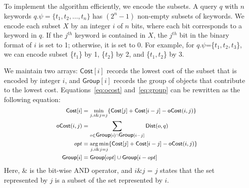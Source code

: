 \documentclass{sig-alternate}
\newcommand{\Dist}{\mbox{$\mathsf{Dist}$}\xspace}
\newcommand{\Cost}{\mbox{$\mathsf{Cost}$}}
\newcommand{\Group}{\mbox{$\mathsf{Group}$}}
\newcounter{example}[section]
\begin{document}
To implement the algorithm efficiently, we encode the subsets.  A
query $q$ with $n$ keywords $q.\psi = \{t_1, t_2, \ldots, t_n\}$ has
$(2^n-1)$ non-empty subsets of keywords. We encode each subset $X$ by
an integer $i$ of $n$ bits, where each bit corresponds to a keyword in
$q$.
%
If the $j^{th}$ keyword is contained in $X$, the $j^{th}$ bit
in the binary format of $i$ is set to 1; otherwise, it is set to 0.
%
For example, for $q.\psi$=\{$t_1, t_2, t_3$\}, we can encode subset
\{$t_1$\} by 1, \{$t_2$\} by 2, and \{$t_1, t_2$\} by 3.

We maintain two arrays: $\Cost[i]$ records the lowest cost of the
subset that is encoded by integer $i$, and $\Group[i]$ records the
group of objects that contribute to the lowest cost.
Equations~\ref{eq:ocost} and~\ref{eq:group} can be rewritten as the
following equation:
%
\begin{equation}\small
\begin{aligned}
\Cost[i] &= \min_{j, i\&j = j} \{ \Cost[j] + \Cost[i-j]- \mathsf{oCost}(i, j)\}\\
\mathsf{oCost}(i, j) &= \sum_{o \in \Group[i] \cap \Group[i-j]} \Dist(o,q)\\ %
opt &= \mathop{\arg\min}_{j, i\&j = j} \{ \Cost[j] + \Cost[i-j]- \mathsf{oCost}(i, j)\} \\%
\Group[i] &= \Group[opt] \cup \Group[i-opt]
\end{aligned} \label{eq:iter}
\end{equation}
%
Here, $\&$ is the bit-wise AND operator, and $i\&j$ = $j$ states that
the set represented by $j$ is a subset of the set represented by
$i$.
\end{document}
